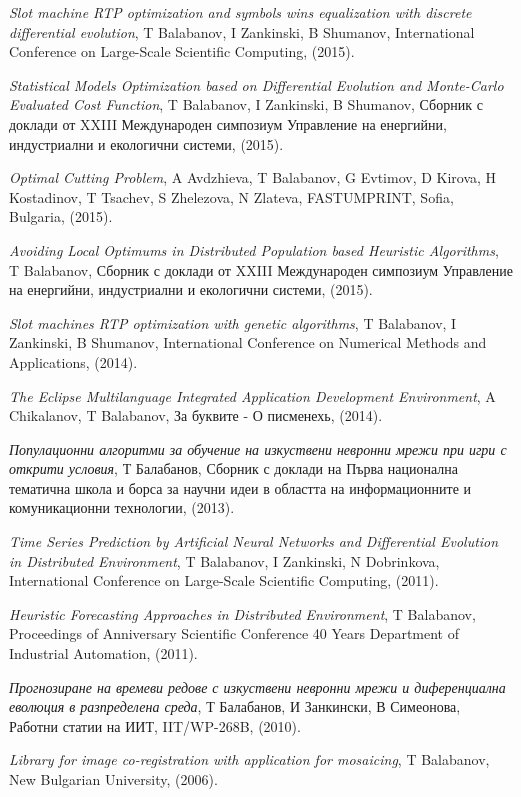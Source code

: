 \documentclass[bulgarian,a4paper]{europasscv}
\begin{document}
\begin{europasscv}
{\begin{ecvitemize}
    \item \textit{Slot machine RTP optimization and symbols wins equalization with discrete differential evolution}, T Balabanov, I Zankinski, B Shumanov, International Conference on Large-Scale Scientific Computing, (2015).
    \item \textit{Statistical Models Optimization based on Differential Evolution and Monte-Carlo Evaluated Cost Function}, T Balabanov, I Zankinski, B Shumanov, Сборник с доклади от XXIII Международен симпозиум Управление на енергийни, индустриални и екологични системи, (2015).
    \item \textit{Optimal Cutting Problem}, A Avdzhieva, T Balabanov, G Evtimov, D Kirova, H Kostadinov, T Tsachev, S Zhelezova, N Zlateva, FASTUMPRINT, Sofia, Bulgaria, (2015).
    \item \textit{Avoiding Local Optimums in Distributed Population based Heuristic Algorithms}, T Balabanov, Сборник с доклади от XXIII Международен симпозиум Управление на енергийни, индустриални и екологични системи, (2015).
    \item \textit{Slot machines RTP optimization with genetic algorithms}, T Balabanov, I Zankinski, B Shumanov, International Conference on Numerical Methods and Applications, (2014).
    \item \textit{The Eclipse Multilanguage Integrated Application Development Environment}, A Chikalanov, T Balabanov, За буквите - О писменехь, (2014).
    \item \textit{Популационни алгоритми за обучение на изкуствени невронни мрежи при игри с открити условия}, Т Балабанов, Сборник с доклади на Първа национална тематична школа и борса за научни идеи в областта на информационните и комуникационни технологии, (2013).
    \item \textit{Time Series Prediction by Artificial Neural Networks and Differential Evolution in Distributed Environment}, T Balabanov, I Zankinski, N Dobrinkova, International Conference on Large-Scale Scientific Computing, (2011).
    \item \textit{Heuristic Forecasting Approaches in Distributed Environment}, T Balabanov, Proceedings of Anniversary Scientific Conference 40 Years Department of Industrial Automation, (2011).
    \item \textit{Прогнозиране на времеви редове с изкуствени невронни мрежи и диференциална еволюция в разпределена среда}, Т Балабанов, И Занкински, В Симеонова, Работни статии на ИИТ, IIT/WP-268B, (2010).
    \item \textit{Library for image co-registration with application for mosaicing}, T Balabanov, New Bulgarian University, (2006).
  \end{ecvitemize}}
  
  \end{europasscv}
\end{document}
